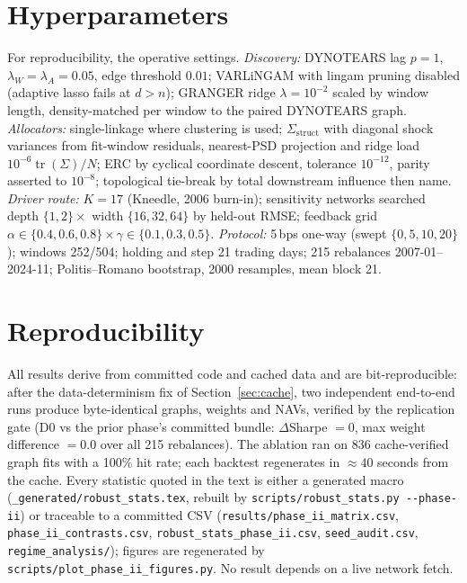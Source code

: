 \section{Hyperparameters}

For reproducibility, the operative settings. \emph{Discovery:} DYNOTEARS lag
$p=1$, $\lambda_W=\lambda_A=0.05$, edge threshold $0.01$; VARLiNGAM with
lingam pruning disabled (adaptive lasso fails at $d>n$); GRANGER ridge
$\lambda=10^{-2}$ scaled by window length, density-matched per window to the
paired DYNOTEARS graph. \emph{Allocators:} single-linkage where clustering is
used; $\Sigma_{\mathrm{struct}}$ with diagonal shock variances from
fit-window residuals, nearest-PSD projection and ridge load
$10^{-6}\operatorname{tr}(\Sigma)/N$; ERC by cyclical coordinate descent,
tolerance $10^{-12}$, parity asserted to $10^{-8}$; topological tie-break by
total downstream influence then name. \emph{Driver route:} $K=17$ (Kneedle,
2006 burn-in); sensitivity networks searched depth $\{1,2\}\times$ width
$\{16,32,64\}$ by held-out RMSE; feedback grid
$\alpha\in\{0.4,0.6,0.8\}\times\gamma\in\{0.1,0.3,0.5\}$.
\emph{Protocol:} 5\,bps one-way (swept $\{0,5,10,20\}$); windows 252/504;
holding and step 21 trading days; 215 rebalances 2007-01--2024-11;
Politis--Romano bootstrap, 2000 resamples, mean block 21.

\section{Reproducibility}

All results derive from committed code and cached data and are
bit-reproducible: after the data-determinism fix of Section~\ref{sec:cache},
two independent end-to-end runs produce byte-identical graphs, weights and
NAVs, verified by the replication gate (D0 vs the prior phase's committed
bundle: $\Delta$Sharpe $= 0$, max weight difference $= 0.0$ over all 215
rebalances). The ablation ran on 836 cache-verified graph fits with a 100\%
hit rate; each backtest regenerates in ${\approx}40$ seconds from the cache.
Every statistic quoted in the text is either a generated macro
(\texttt{\_generated/robust\_stats.tex}, rebuilt by
\texttt{scripts/robust\_stats.py -{}-phase-ii}) or traceable to a committed
CSV (\texttt{results/phase\_ii\_matrix.csv},
\texttt{phase\_ii\_contrasts.csv}, \texttt{robust\_stats\_phase\_ii.csv},
\texttt{seed\_audit.csv}, \texttt{regime\_analysis/}); figures are
regenerated by \texttt{scripts/plot\_phase\_ii\_figures.py}. No result
depends on a live network fetch.
